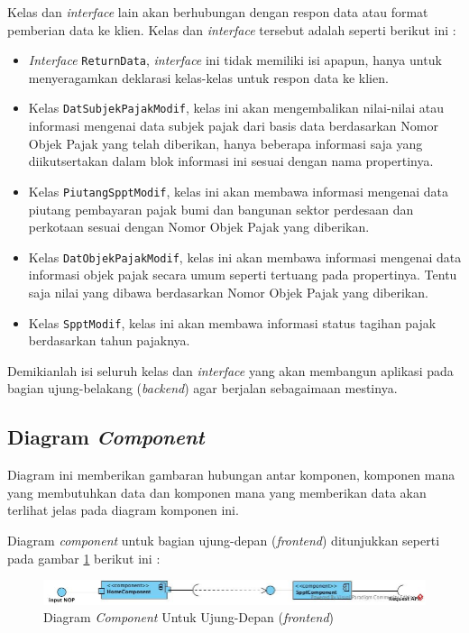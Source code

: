 \documentclass[pdftex,12pt, oneside]{article}
\begin{document}
Kelas dan \textit{interface} lain akan berhubungan dengan respon data atau format pemberian data ke klien. Kelas dan \textit{interface} tersebut adalah seperti berikut ini :

\begin{itemize}
	\item \textit{Interface} \texttt{ReturnData}, \textit{interface} ini tidak memiliki isi apapun, hanya untuk menyeragamkan deklarasi kelas-kelas untuk respon data ke klien.
	\item Kelas \texttt{DatSubjekPajakModif}, kelas ini akan mengembalikan nilai-nilai atau informasi mengenai data subjek pajak dari basis data berdasarkan Nomor Objek Pajak yang telah diberikan, hanya beberapa informasi saja yang diikutsertakan dalam blok informasi ini sesuai dengan nama propertinya.
	\item Kelas \texttt{PiutangSpptModif}, kelas ini akan membawa informasi mengenai data piutang pembayaran pajak bumi dan bangunan sektor perdesaan dan perkotaan sesuai dengan Nomor Objek Pajak yang diberikan.
	\item Kelas \texttt{DatObjekPajakModif}, kelas ini akan membawa informasi mengenai data informasi objek pajak secara umum seperti tertuang pada propertinya. Tentu saja nilai yang dibawa berdasarkan Nomor Objek Pajak yang diberikan.
	\item Kelas \texttt{SpptModif}, kelas ini akan membawa informasi status tagihan pajak berdasarkan tahun pajaknya.
\end{itemize}

Demikianlah isi seluruh kelas dan \textit{interface} yang akan membangun aplikasi pada bagian ujung-belakang (\textit{backend}) agar berjalan sebagaimaan mestinya.

\subsection{Diagram \textit{Component}}

Diagram ini memberikan gambaran hubungan antar komponen, komponen mana yang membutuhkan data dan komponen mana yang memberikan data akan terlihat jelas pada diagram komponen ini. 

Diagram \textit{component} untuk bagian ujung-depan (\textit{frontend}) ditunjukkan seperti pada gambar \ref{fig:comp-dia-fe} berikut ini :

\begin{figure}[H]
	\centering
	\includegraphics[width=1\textwidth]{./resources/component-diagram-fe}
	\caption{Diagram \textit{Component} Untuk Ujung-Depan (\textit{frontend})}
	\label{fig:comp-dia-fe}
\end{figure}
\end{document}
